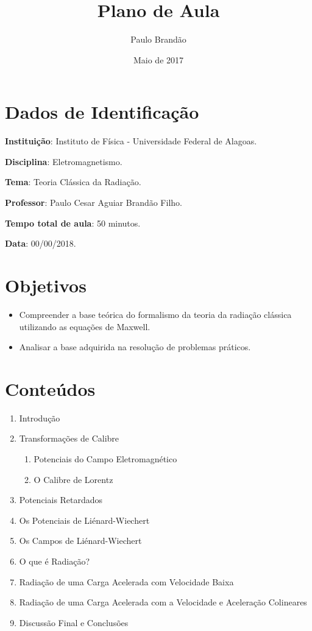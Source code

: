 \documentclass{article}
\title{\Huge\color{astral}\textbf{Plano de Aula}}
\author{Paulo Brandão}
\date{Maio de 2017}
\begin{document}
\maketitle

\section{Dados de Identificação}

\noindent \textbf{Instituição}: Instituto de Física - Universidade Federal de Alagoas.

\noindent \textbf{Disciplina}: Eletromagnetismo.

\noindent \textbf{Tema}: Teoria Clássica da Radiação.

\noindent \textbf{Professor}: Paulo Cesar Aguiar Brandão Filho.

\noindent \textbf{Tempo total de aula}: 50 minutos.

\noindent \textbf{Data}: 00/00/2018.

\section{Objetivos}

\begin{itemize}
    \item Compreender a base teórica do formalismo da teoria da radiação clássica utilizando as equações de Maxwell.
    \item Analisar a base adquirida na resolução de problemas práticos.
\end{itemize}

\section{Conteúdos}

\begin{enumerate}
    \item Introdução
    \item Transformações de Calibre
        \begin{enumerate}
            \item Potenciais do Campo Eletromagnético
            \item O Calibre de Lorentz
        \end{enumerate}
    \item Potenciais Retardados
    \item Os Potenciais de Liénard-Wiechert
    \item Os Campos de Liénard-Wiechert
    \item O que é Radiação?
    \item Radiação de uma Carga Acelerada com Velocidade Baixa
    \item Radiação de uma Carga Acelerada com a Velocidade e Aceleração Colineares
    \item Discussão Final e Conclusões
\end{enumerate}
\end{document}
